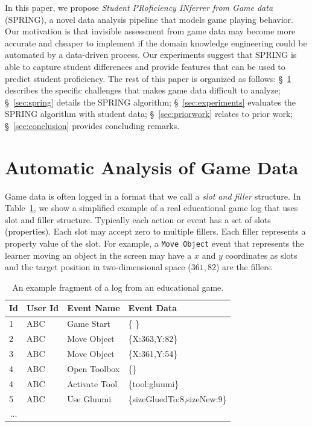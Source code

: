 \documentclass{sigchi}
\def\algname{SPRING\xspace}
\begin{document}
	
	In this paper, we propose \textit{Student PRoficiency INferrer from Game data} (SPRING), a novel data analysis pipeline that models game playing behavior.
	Our motivation is that invisible assessment from game data may become more accurate and cheaper to implement if the domain knowledge engineering could be automated by a data-driven process.
	Our experiments suggest that \algname is able to capture student differences and provide features that can be used to predict student proficiency.
	The rest of this paper is organized as follows:
	\S~\ref{sec:game_data}   describes the specific challenges that makes game data  difficult to analyze;
	\S~\ref{sec:spring} details the SPRING algorithm;
	\S~\ref{sec:experiments} evaluates the SPRING algorithm with student data;
	\S~\ref{sec:priorwork} relates to prior work;
	\S~\ref{sec:conclusion} provides concluding remarks.
	
	
	\section{Automatic Analysis of Game Data}
	\label{sec:game_data}
	Game data is often logged  in a format that we call a \textit{slot and filler} structure.
	In Table~\ref{tbl:log_example}, we show a simplified example of a real educational game log that uses slot and filler structure.
	Typically each action or event has a set of slots (properties).
	Each slot may accept zero to multiple fillers. 
	Each filler represents a property value of the slot.
	For example, a \texttt{Move Object} event  that represents the learner moving an object in the screen may have a $x$ and $y$ coordinates as slots and the target position in two-dimensional space ($361, 82$) are the fillers.
	\newline
	
	\begin{table}[tbh]
		\begin{tabular}{@{}llll@{}}
			\toprule
			\textbf{Id}             & \textbf{User Id} & \textbf{Event Name} & \textbf{Event Data}        \\ \midrule
			1                       & ABC              & Game Start          & \{ \}                        \\
			2                       & ABC              & Move Object         & \{X:363,Y:82\} \\
			3                       & ABC              & Move Object         & \{X:361,Y:54\} \\
			4                       & ABC              & Open Toolbox        & \{\}        \\
			4                       & ABC              & Activate Tool        & \{tool:gluumi\}        \\
			5                       & ABC              & Use Gluumi        & \{sizeGluedTo:8,sizeNew:9\} \\        
			\multicolumn{1}{c}{...} &                  &                     &                            \\ \bottomrule
		\end{tabular}
		\caption{An example fragment of a log from an educational game. \label{tbl:log_example}}
	\end{table}
	
\end{document}

